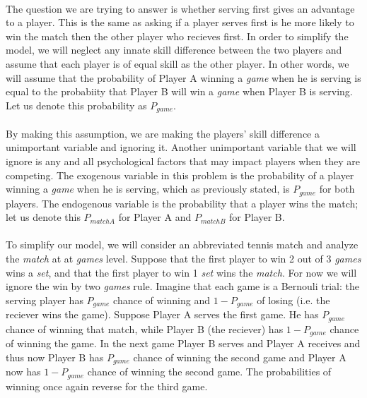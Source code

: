 \documentclass[12pt]{article}
\begin{document}
\paragraph{} The question we are trying to answer is whether serving first gives an advantage to a player. This is the same as asking if a player serves first is he more likely to win the match then the other player who recieves first. In order to simplify the model, we will neglect any innate skill difference between the two players and assume that each player is of equal skill as the other player. In other words, we will assume that the probability of Player A winning a \emph{game} when he is serving is equal to the probabiity that Player B will win a \emph{game} when Player B is serving. Let us denote this probability as $P_{game}$.

\paragraph{} By making this assumption, we are making the players' skill difference a unimportant variable and ignoring it. Another unimportant variable that we will ignore is any and all psychological factors that may impact players when they are competing. The exogenous variable in this problem is the probability of a player winning a \emph{game} when he is serving, which as previously stated, is $P_{game}$ for both players. The endogenous variable is the probability that a player wins the match; let us denote this $P_{matchA}$ for Player A and $P_{matchB}$ for Player B.

\paragraph{} To simplify our model, we will consider an abbreviated tennis match and analyze the \emph{match} at at \emph{games} level. Suppose that the first player to win 2 out of 3 \emph{games} wins a \emph{set}, and that the first player to win 1 \emph{set} wins the \emph{match}. For now we will ignore the win by two \emph{games} rule. Imagine that each game is a Bernouli trial: the serving player has $P_{game}$ chance of winning and $1-P_{game}$ of losing (i.e. the reciever wins the game). Suppose Player A serves the first game. He has $P_{game}$ chance of winning that match, while Player B (the reciever) has $1-P_{game}$ chance of winning the game. In the next game Player B serves and Player A receives and thus now Player B has $P_{game}$ chance of winning the second game and Player A now has $1-P_{game}$ chance of winning the second game. The probabilities of winning once again reverse for the third game. 
\end{document}
